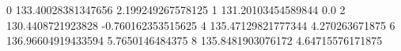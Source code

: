 0 133.40028381347656 2.199249267578125
1 131.20103454589844 0.0
2 130.4408721923828 -0.760162353515625
4 135.47129821777344 4.270263671875
6 136.96604919433594 5.7650146484375
8 135.8481903076172 4.64715576171875
